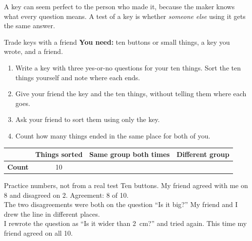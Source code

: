 \label{ch4}

A key can seem perfect to the person who made it, because the maker knows what every question means. A test of a key is whether \emph{someone else} using it gets the same answer.

\begin{tryit}{Trade keys with a friend}
\textbf{You need:} ten buttons or small things, a key you wrote, and a friend.
\begin{enumerate}[leftmargin=1.6em]
\item Write a key with three yes-or-no questions for your ten things. Sort the ten things yourself and note where each ends.
\item Give your friend the key and the ten things, without telling them where each goes.
\item Ask your friend to sort them using only the key.
\item Count how many things ended in the same place for both of you.
\end{enumerate}
\par\medskip
\renewcommand{\arraystretch}{1.6}
\begin{tabular}{|l|c|c|c|}
\hline
 & \textbf{Things sorted} & \textbf{Same group both times} & \textbf{Different group}\\ \hline
\textbf{Count} & 10 & & \\ \hline
\end{tabular}
\end{tryit}

\begin{worked}{Practice numbers, not from a real test}
Ten buttons. My friend agreed with me on 8 and disagreed on 2. Agreement: 8 of 10.\\
The two disagreements were both on the question ``Is it big?'' My friend and I drew the line in different places.\\
I rewrote the question as ``Is it wider than 2~cm?'' and tried again. This time my friend agreed on all 10.
\end{worked}

\begin{center}
\end{center}

